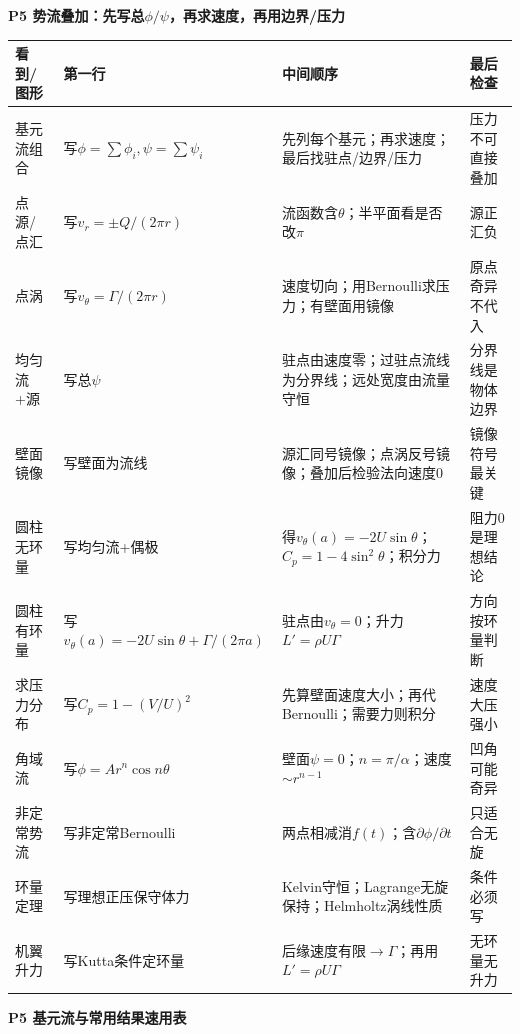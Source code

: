\documentclass[UTF8,a4paper]{ctexart}
\newcommand{\ftitle}[1]{\vspace{1pt}\textbf{\textcolor{B}{#1}}\par\vspace{0.5pt}}
\begin{document}
\ftitle{P5 势流叠加：先写总$\phi/\psi$，再求速度，再用边界/压力}
\begin{tabular}{|L{0.19\textwidth}|L{0.23\textwidth}|L{0.34\textwidth}|L{0.19\textwidth}|}\hline
\textbf{看到/图形} & \textbf{第一行} & \textbf{中间顺序} & \textbf{最后检查}\\\hline
基元流组合 & 写$\phi=\sum\phi_i,\psi=\sum\psi_i$ & 先列每个基元；再求速度；最后找驻点/边界/压力 & 压力不可直接叠加 \\\hline
点源/点汇 & 写$v_r=\pm Q/(2\pi r)$ & 流函数含$\theta$；半平面看是否改$\pi$ & 源正汇负 \\\hline
点涡 & 写$v_\theta=\Gamma/(2\pi r)$ & 速度切向；用Bernoulli求压力；有壁面用镜像 & 原点奇异不代入 \\\hline
均匀流+源 & 写总$\psi$ & 驻点由速度零；过驻点流线为分界线；远处宽度由流量守恒 & 分界线是物体边界 \\\hline
壁面镜像 & 写壁面为流线 & 源汇同号镜像；点涡反号镜像；叠加后检验法向速度0 & 镜像符号最关键 \\\hline
圆柱无环量 & 写均匀流+偶极 & 得$v_\theta(a)=-2U\sin\theta$；$C_p=1-4\sin^2\theta$；积分力 & 阻力0是理想结论 \\\hline
圆柱有环量 & 写$v_\theta(a)=-2U\sin\theta+\Gamma/(2\pi a)$ & 驻点由$v_\theta=0$；升力$L'=\rho U\Gamma$ & 方向按环量判断 \\\hline
求压力分布 & 写$C_p=1-(V/U)^2$ & 先算壁面速度大小；再代Bernoulli；需要力则积分 & 速度大压强小 \\\hline
角域流 & 写$\phi=Ar^n\cos n\theta$ & 壁面$\psi=0$；$n=\pi/\alpha$；速度$\sim r^{n-1}$ & 凹角可能奇异 \\\hline
非定常势流 & 写非定常Bernoulli & 两点相减消$f(t)$；含$\partial\phi/\partial t$ & 只适合无旋 \\\hline
环量定理 & 写理想正压保守体力 & Kelvin守恒；Lagrange无旋保持；Helmholtz涡线性质 & 条件必须写 \\\hline
机翼升力 & 写Kutta条件定环量 & 后缘速度有限$\to\Gamma$；再用$L'=\rho U\Gamma$ & 无环量无升力 \\\hline
\end{tabular}
\ftitle{P5 基元流与常用结果速用表}
\end{document}

